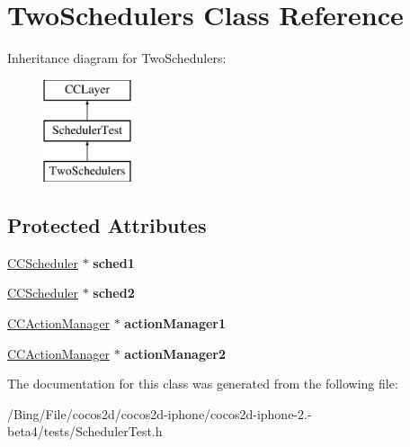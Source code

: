 \hypertarget{interface_two_schedulers}{\section{Two\-Schedulers Class Reference}
\label{interface_two_schedulers}
}
Inheritance diagram for Two\-Schedulers\-:\begin{figure}[H]
\begin{center}
\leavevmode
\includegraphics[height=3.000000cm]{interface_two_schedulers}
\end{center}
\end{figure}
\subsection*{Protected Attributes}
\begin{DoxyCompactItemize}
\item 
\hypertarget{interface_two_schedulers_adbe01fb23d3b5a6cb56ca38cf95278b6}{\hyperlink{class_c_c_scheduler}{C\-C\-Scheduler} $\ast$ {\bfseries sched1}}\label{interface_two_schedulers_adbe01fb23d3b5a6cb56ca38cf95278b6}

\item 
\hypertarget{interface_two_schedulers_a2cf2438f9099c1a6462b1917245cd397}{\hyperlink{class_c_c_scheduler}{C\-C\-Scheduler} $\ast$ {\bfseries sched2}}\label{interface_two_schedulers_a2cf2438f9099c1a6462b1917245cd397}

\item 
\hypertarget{interface_two_schedulers_abf84b0e9d23b2046ae3885bd9bad3fa9}{\hyperlink{interface_c_c_action_manager}{C\-C\-Action\-Manager} $\ast$ {\bfseries action\-Manager1}}\label{interface_two_schedulers_abf84b0e9d23b2046ae3885bd9bad3fa9}

\item 
\hypertarget{interface_two_schedulers_ac3408a6aa3794bc8194cad2d81d7b3f8}{\hyperlink{interface_c_c_action_manager}{C\-C\-Action\-Manager} $\ast$ {\bfseries action\-Manager2}}\label{interface_two_schedulers_ac3408a6aa3794bc8194cad2d81d7b3f8}

\end{DoxyCompactItemize}


The documentation for this class was generated from the following file\-:\begin{DoxyCompactItemize}
\item 
/\-Bing/\-File/cocos2d/cocos2d-\/iphone/cocos2d-\/iphone-\/2.-\/beta4/tests/Scheduler\-Test.\-h\end{DoxyCompactItemize}
